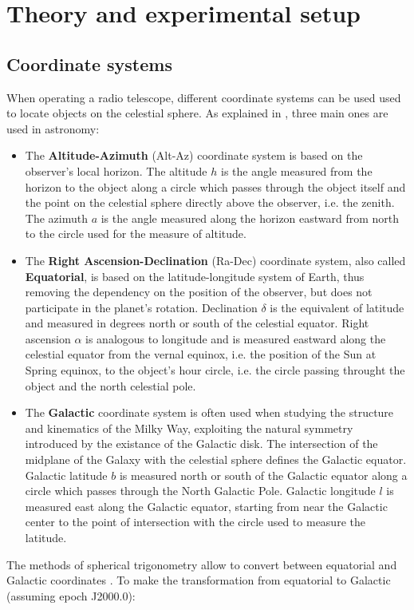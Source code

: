 \section{Theory and experimental setup}
\subsection{Coordinate systems}
When operating a radio telescope, different coordinate systems can be used used to locate objects on the celestial sphere.
As explained in \cite{carroll_introduction_2007}, three main ones are used in astronomy:
\begin{itemize}
    \item The \textbf{Altitude-Azimuth} (Alt-Az) coordinate system is based on the observer's local horizon. The {altitude} $h$ is the angle measured from the horizon to the object along a circle which passes through the object itself and the point on the celestial sphere directly above the observer, i.e. the zenith. The {azimuth} $a$ is the angle measured along the horizon eastward from north to the circle used for the measure of altitude.
    \item The \textbf{Right Ascension-Declination} (Ra-Dec) coordinate system, also called \textbf{Equatorial}, is based on the latitude-longitude system of Earth, thus removing the dependency on the position of the observer, but does not participate in the planet's rotation. {Declination} $\delta$ is the equivalent of latitude and measured in degrees north or south of the celestial equator. {Right ascension} $\alpha$ is analogous to longitude and is measured eastward along the celestial equator from the vernal equinox, i.e. the position of the Sun at Spring equinox, to the object's hour circle, i.e. the circle passing throught the object and the north celestial pole.
    \item The \textbf{Galactic} coordinate system is often used when studying the structure and kinematics of the Milky Way, exploiting the natural symmetry introduced by the existance of the Galactic disk. The intersection of the midplane of the Galaxy with the celestial sphere defines the Galactic equator. {Galactic latitude} $b$ is measured north or south of the Galactic equator along a circle which passes through the North Galactic Pole. {Galactic longitude} $l$ is measured east along the Galactic equator, starting from near the Galactic center to the point of intersection with the circle used to measure the latitude.
\end{itemize}
The methods of spherical trigonometry allow to convert between equatorial and Galactic coordinates \Cite{carroll_introduction_2007}. To make the transformation from equatorial to Galactic (assuming epoch J2000.0):
